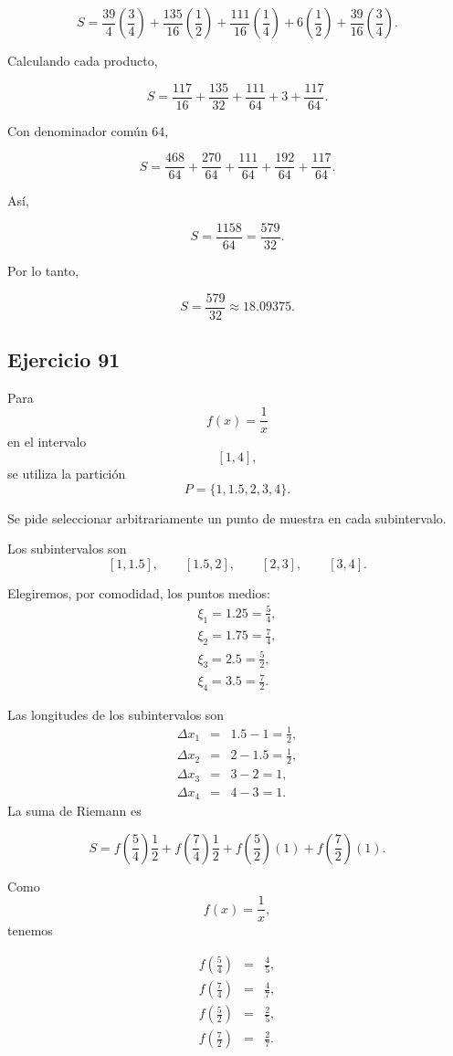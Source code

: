 \documentclass[12pt]{article}
\begin{document}
\[S=\frac{39}{4}\left(\frac34\right)+\frac{135}{16}\left(\frac12\right)+\frac{111}{16}\left(\frac14\right)+6\left(\frac12\right)+\frac{39}{16}\left(\frac34\right).\]

Calculando cada producto,

\[S=\frac{117}{16}+\frac{135}{32}+\frac{111}{64}+3+\frac{117}{64}.\]

Con denominador común \(64\),

\[S=\frac{468}{64}+\frac{270}{64}+\frac{111}{64}+\frac{192}{64}+\frac{117}{64}.\]

Así,

\[S=\frac{1158}{64}=\frac{579}{32}.\]

Por lo tanto,

\[\boxed{S=\frac{579}{32}\approx18.09375}.\]

\subsection*{Ejercicio 91}
Para
\[f(x)=\frac1x\]
en el intervalo
\[[1,4],\]
se utiliza la partición
\[P=\{1,1.5,2,3,4\}.\]

Se pide seleccionar arbitrariamente un punto de muestra en cada subintervalo.

Los subintervalos son
\[
[1,1.5],\qquad
[1.5,2],\qquad
[2,3],\qquad
[3,4].
\]

Elegiremos, por comodidad, los puntos medios:
\begin{eqnarray*}
\xi_1=1.25=\frac54,\\
\xi_2=1.75=\frac74,\\
\xi_3=2.5=\frac52,\\
\xi_4=3.5=\frac72.
\end{eqnarray*}

Las longitudes de los subintervalos son
\begin{eqnarray*}
\Delta x_1&=&1.5-1=\frac12,\\
\Delta x_2&=&2-1.5=\frac12,\\
\Delta x_3&=&3-2=1,\\
\Delta x_4&=&4-3=1.
\end{eqnarray*}
La suma de Riemann es

\[S=f\left(\frac54\right)\frac12+f\left(\frac74\right)\frac12+f\left(\frac52\right)(1)+f\left(\frac72\right)(1).\]

Como
\[f(x)=\frac1x,\]
tenemos

\begin{eqnarray*}
f\left(\frac54\right)&=&\frac45,\\
f\left(\frac74\right)&=&\frac47,\\
f\left(\frac52\right)&=&\frac25,\\
f\left(\frac72\right)&=&\frac27.
\end{eqnarray*}
\end{document}

